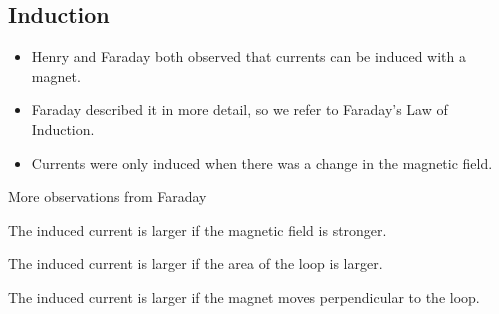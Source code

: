 \documentclass[aspectratio=169,
hyperref={colorlinks,urlcolor=blue}
]{beamer}
\begin{document}






\subsection{Induction}
\label{subsec:induction}
{
\begin{itemize}
\item Henry and Faraday both observed that currents can be induced with a magnet.
\item Faraday described it in more detail, so we refer to Faraday’s Law of Induction.
\item Currents were only induced when there was a change in the magnetic field.
\end{itemize}
}
{
\vspace{-2cm}
}


\begin{bulletframe}{More observations from Faraday}
\item The induced current is larger if the magnetic field is stronger.
\item The induced current is larger if the area of the loop is larger.
\item The induced current is larger if the magnet moves perpendicular to the loop.
\end{bulletframe}


\end{document}
